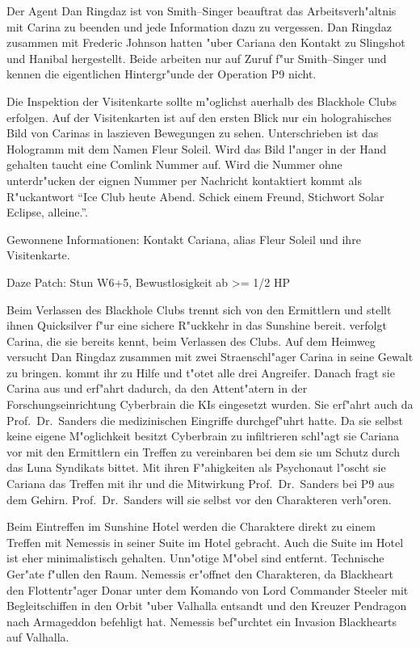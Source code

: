 Der Agent {\emph{}Dan Ringdaz} ist von Smith--Singer beauftrat das Arbeitsverh"altnis mit Carina zu beenden und jede Information dazu zu vergessen. Dan Ringdaz zusammen mit Frederic Johnson hatten "uber Cariana den Kontakt zu Slingshot und Hanibal hergestellt. Beide arbeiten nur auf Zuruf f"ur Smith--Singer und kennen die eigentlichen Hintergr"unde der Operation P9 nicht.

Die Inspektion der Visitenkarte sollte m"oglichst au\3erhalb des Blackhole Clubs erfolgen. Auf der Visitenkarten ist auf den ersten Blick nur ein holograhisches Bild von Carinas in laszieven Bewegungen zu sehen. Unterschrieben ist das Hologramm mit dem Namen Fleur Soleil. Wird das Bild l"anger in der Hand gehalten taucht eine Comlink Nummer auf. Wird die Nummer ohne unterdr"ucken der eignen Nummer per Nachricht kontaktiert kommt als R"uckantwort "`Ice Club heute Abend. Schick einem Freund, Stichwort Solar Eclipse, alleine."'.

\begin{remarks}
	Gewonnene Informationen: Kontakt Cariana, alias Fleur Soleil und ihre Visitenkarte.

	Daze Patch: Stun W6+5, Bewustlosigkeit ab >= 1/2 HP
\end{remarks}



Beim Verlassen des Blackhole Clubs trennt sich \xl{} von den Ermittlern und stellt ihnen Quicksilver f"ur eine sichere R"uckkehr in das Sunshine bereit. \xl{} verfolgt Carina, die sie bereits kennt, beim Verlassen des Clubs. Auf dem Heimweg versucht Dan Ringdaz zusammen mit zwei Stra\3enschl"ager Carina in seine Gewalt zu bringen. \xl{} kommt ihr zu Hilfe und t"otet alle drei Angreifer. Danach fragt sie Carina aus und erf"ahrt dadurch, da\3 den Attent"atern in der Forschungseinrichtung Cyberbrain die KIs eingesetzt wurden. Sie erf"ahrt auch da\3 Prof.~Dr.~Sanders die medizinischen Eingriffe durchgef"uhrt hatte. Da sie selbst keine eigene M"oglichkeit besitzt Cyberbrain zu infiltrieren schl"agt sie Cariana vor mit den Ermittlern ein Treffen zu vereinbaren bei dem sie um Schutz durch das Luna Syndikats bittet. Mit ihren F"ahigkeiten als Psychonaut l"oscht sie Cariana das Treffen mit ihr und die Mitwirkung Prof.~Dr.~Sanders bei P9 aus dem Gehirn. Prof.~Dr.~Sanders will sie selbst vor den Charakteren verh"oren.

Beim Eintreffen im Sunshine Hotel werden die Charaktere direkt zu einem Treffen mit Nemessis in seiner Suite im Hotel gebracht. Auch die Suite im Hotel ist eher minimalistisch gehalten. Unn"otige M"obel sind entfernt. Technische Ger"ate f"ullen den Raum. Nemessis er"offnet den Charakteren, da\3 Blackheart den Flottentr"ager Donar unter dem Komando von Lord Commander Steeler mit Begleitschiffen in den Orbit "uber Valhalla entsandt und den Kreuzer Pendragon nach Armageddon befehligt hat. Nemessis bef"urchtet ein Invasion Blackhearts auf Valhalla.

